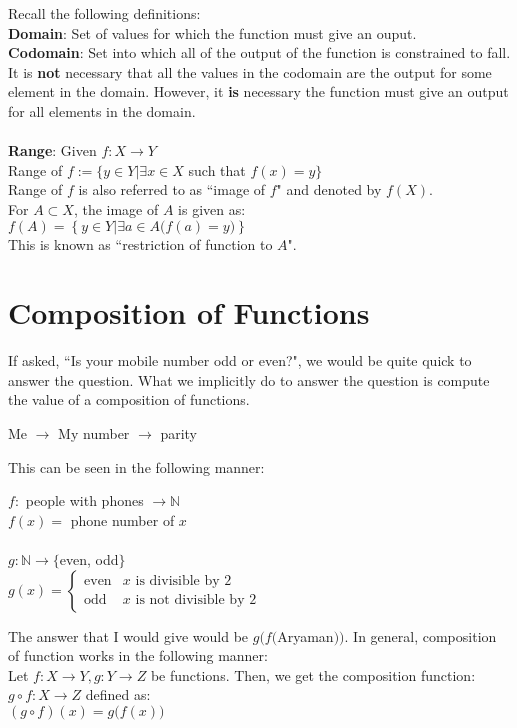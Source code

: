 Recall the following definitions:\\
\textbf{Domain}: Set of values for which the function must give an ouput.\\
\textbf{Codomain}: Set into which all of the output of the function is constrained to fall.\\
It is \textbf{not} necessary that all the values in the codomain are the output for some element in the domain. However, it \textbf{is} necessary the function must give an output for all elements in the domain.\\~\\
\textbf{Range}: Given $f:X\to Y$\\
Range of $f:=\{y\in Y|\exists x \in X$ such that $f(x)=y\}$\\
Range of $f$ is also referred to as ``image of $f$" and denoted by $f(X)$.\\
For $A\subset X$, the image of $A$ is given as:\\
$f(A) =\left\{y \in Y | \exists a \in A \big(f(a) = y\big)\right\}$\\
This is known as ``restriction of function to $A$".
\section{Composition of Functions}
If asked, ``Is your mobile number odd or even?", we would be quite quick to answer the question. What we implicitly do to answer the question is compute the value of a composition of functions.
\begin{center}
    Me $\to$ My number $\to$ parity
\end{center}
This can be seen in the following manner:
\begin{center}
    $f:$ people with phones $\to \mathbb{N}$\\
    $f(x) = $ phone number of $x$\\~\\
    $g:\mathbb{N}\to\{$even, odd$\}$\\
    $g(x) = \left\{
    \begin{array}{lr}
        \text{even} & x \text{ is divisible by }2 \\
        \text{odd} & x \text{ is not divisible by }2
    \end{array}\right.$
\end{center}
The answer that I would give would be $g(f($Aryaman$))$.
In general, composition of function works in the following manner:\\
Let $f:X\to Y, g:Y\to Z$ be functions. Then, we get the composition function:\\
$g\circ f:X \to Z$ defined as:\\
$(g\circ f)(x) = g\big(f(x)\big)$
